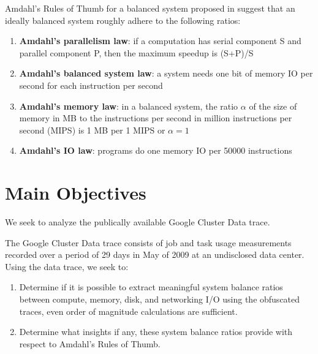 \documentclass[a0,portrait]{a0poster}
\begin{document}
\begin{multicols}{2}
\noindent Amdahl's Rules of Thumb for a balanced system proposed in suggest that an ideally balanced system roughly adhere to the following ratios: \\
\begin{enumerate}
\item \textbf{Amdahl's parallelism law}: if a computation has serial component S and parallel component P, then the maximum speedup is (S+P)/S \\
\item \textbf{Amdahl's balanced system law}: a system needs one bit of memory IO per second for each instruction per second \\
\item \textbf{Amdahl's memory law}: in a balanced system, the ratio $\alpha$ of the size of memory in MB to the instructions per second in million instructions per second (MIPS) is 1 MB per 1 MIPS or $\alpha = 1$ \\
\item \textbf{Amdahl's IO law}: programs do one memory IO per 50000 instructions
\end{enumerate}



\section*{Main Objectives}

We seek to analyze the publically available Google Cluster Data trace.

The Google Cluster Data trace consists of job and task usage measurements recorded over a period of 29 days in May of 2009 at an undisclosed data center. 
Using the data trace, we seek to:

\begin{enumerate}
\item[1] Determine if it is possible to extract meaningful system balance ratios between compute, memory, disk, and networking I/O using the obfuscated traces, even order of magnitude calculations are sufficient.
\item[2] Determine what insights if any, these system balance ratios provide with respect to Amdahl's Rules of Thumb.
\end{enumerate}


\end{multicols}
\end{document}
